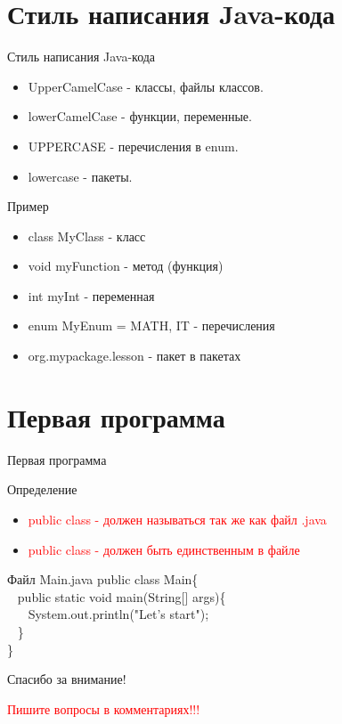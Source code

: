 \documentclass{beamer}
\newenvironment{rusdefinition}[1][Определение]{
    \begin{block}{#1}
}{\end{block}}
\newenvironment{rexample}[1][Пример]{\begin{exampleblock}{#1}}{\end{exampleblock}}
\newenvironment{forMain}[1][Файл Main.java]{\begin{exampleblock}{#1}}{\end{exampleblock}}
\begin{document}
\section{Стиль написания Java-кода}
\begin{frame}{Стиль написания Java-кода}
    \begin{itemize}
        \item UpperCamelCase - классы, файлы классов.
        \item lowerCamelCase - функции, переменные. 
        \item UPPERCASE - перечисления в enum.
        \item lowercase - пакеты.
    \end{itemize}
    \begin{rexample}
        \begin{itemize}
            \item class MyClass - класс
            \item void myFunction - метод (функция)
            \item int myInt - переменная 
            \item enum MyEnum = {MATH, IT} - перечисления 
            \item org.mypackage.lesson - пакет в пакетах
        \end{itemize}
    \end{rexample}
    
\end{frame}

\section{Первая программа}
\begin{frame}{Первая программа}
    \begin{rusdefinition}
        \begin{itemize} 
            \item \textcolor{red}{public class - должен называться так же как файл .java}
            \item \textcolor{red}{public class - должен быть единственным в файле}
        \end{itemize}
    \end{rusdefinition}

    \begin{forMain}
        public class Main\{ \\
            \texttt{ } public static void main(String[] args)\{ \\
            \texttt{ } \texttt{ } System.out.println("Let's start"); \\
            \texttt{ } \}    \\
        \}
    \end{forMain}
\end{frame}

\begin{frame}{}
    \centering
    \Large Спасибо за внимание! 

    \small \textcolor{red}{Пишите вопросы в комментариях!!!}
    
    \vspace{1cm}
\end{frame}
\end{document}
